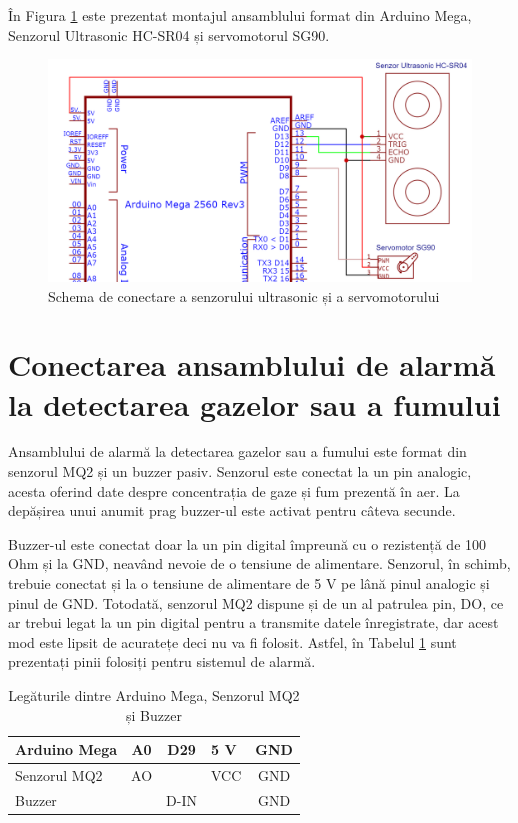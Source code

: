 În Figura \ref{fig:conexiune_servo_hcsr04} este prezentat montajul ansamblului format din Arduino Mega, Senzorul Ultrasonic HC-SR04 și servomotorul SG90.

\begin{figure}[H]
\includegraphics[width=1\textwidth, height=0.6\textwidth]{bachelors_ro/images/conexiune_servo_hcsr04.png}
\caption{Schema de conectare a senzorului ultrasonic și a servomotorului}
\label{fig:conexiune_servo_hcsr04}
\end{figure}

\section{Conectarea ansamblului de alarmă la detectarea gazelor sau a fumului}
Ansamblului de alarmă la detectarea gazelor sau a fumului este format din senzorul MQ2 și un buzzer pasiv. Senzorul este conectat la un pin analogic, acesta oferind date despre concentrația de gaze și fum prezentă în aer. La depășirea unui anumit prag buzzer-ul este activat pentru câteva secunde.

Buzzer-ul este conectat doar la un pin digital împreună cu o rezistență de 100 Ohm și la GND, neavând nevoie de o tensiune de alimentare. Senzorul, în schimb, trebuie conectat și la o tensiune de alimentare de 5 V pe lână pinul analogic și pinul de GND. Totodată, senzorul MQ2 dispune și de un al patrulea pin, DO, ce ar trebui legat la un pin digital pentru a transmite datele înregistrate, dar acest mod este lipsit de acuratețe deci nu va fi folosit. Astfel, în Tabelul \ref{tab:conexiune_mega_mq2_buzzer} sunt prezentați pinii folosiți pentru sistemul de alarmă.

\begin{table}[H]
\caption{Legăturile dintre Arduino Mega, Senzorul MQ2 și Buzzer}
\label{tab:conexiune_mega_mq2_buzzer}
\fontsize{12}{14}\selectfont
\begin{tabular}{|l|c|c|l|c|}
\hline
Arduino Mega & A0 & D29 & 5 V & GND \\ \hline
Senzorul MQ2 & AO & & VCC & GND \\ \hline
Buzzer & & D-IN & & GND \\ \hline
\end{tabular}
\end{table}

